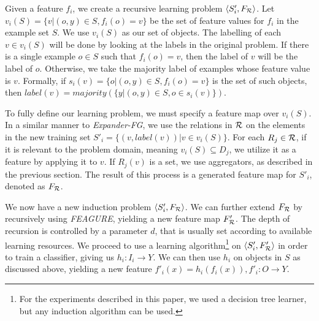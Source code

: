 \documentclass[twoside,11pt]{article}
\theoremstyle{definition}
\begin{document}

Given a feature $f_{i}$, we create a recursive learning problem $\langle S'_i,F_{\cal R} \rangle$. %
 Let $v_i(S) = \{v | (o,y) \in S, f_{i}(o)=v\}$ be the set of feature values for $f_i$ in the example set $S$. %
We use $v_i(S)$ as our set of objects. The labelling of each $v \in v_i(S)$ will be done by looking at the labels in the original problem.
 If there is a single example $o \in S$ such that $f_i(o)=v$, then the label of $v$ will be the label of $o$. Otherwise, we take the majority label of examples whose feature value is $v$. Formally, if $s_i(v)=\{o | (o,y)\in S, f_{i}(o)=v\}$ is the set of such objects, then $label(v)=majority(\{y|(o,y)\in S, o\in s_i(v)\})$.

To fully define our learning problem, we must specify a feature map over $v_i(S)$. In a similar manner to \emph{Expander-FG}, we use the relations in ${\cal R}$ on the elements in the new training set $S'_i = \{ (v, label(v)) | v \in v_i(S) \}$.
For each $R_j\in {\cal R}$, if it is relevant to the problem domain, meaning $v_i(S)\subseteq D_j$, we utilize it as a feature by applying it to $v$. If $R_j(v)$ is a set, we use aggregators, as described in the previous section. 
The result of this process is a generated feature map for $S'_i$, denoted as $F_{\cal R}$. 

We now have a new induction problem $\langle S'_i,F_{\cal R} \rangle$.
We can further extend $F_{\cal R}$ by recursively using \emph{FEAGURE}, yielding a new feature map $F'_{\cal R}$. The depth of recursion is controlled by a parameter $d$, that is usually set according to available learning resources.
We proceed to use a learning algorithm\footnote{For the experiments described in this paper, we used a decision tree learner, but any induction algorithm can be used.} on $\langle S'_i,F'_{\cal R} \rangle$ in order to train a classifier, giving us $h_i:I_i\rightarrow Y$. We can then use $h_i$ on objects in $S$ as discussed above, yielding a new feature $f'_{i}(x)=h_{i}(f_{i}(x)), f'_{i}:O\rightarrow Y$. 
\end{document}
